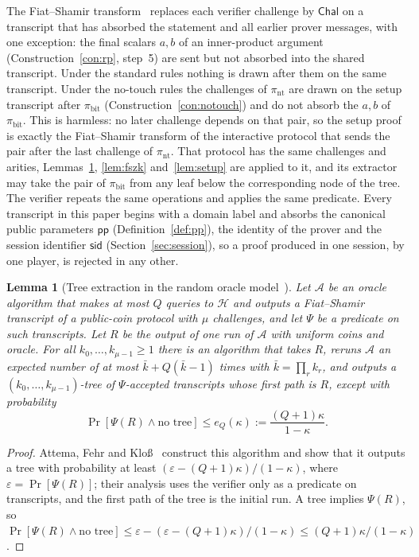 \documentclass[11pt]{article}
\newtheorem{lemma}{Lemma}[section]
\theoremstyle{definition}
\theoremstyle{remark}
\newcommand{\sid}{\mathsf{sid}}
\newcommand{\pp}{\mathsf{pp}}
\newcommand{\RO}{\mathcal{H}}
\begin{document}
The Fiat--Shamir transform~\cite{fiat-shamir} replaces each verifier challenge by $\mathsf{Chal}$ on a transcript that has absorbed the statement and all earlier prover messages, with one exception: the final scalars $a,b$ of an inner-product argument (Construction~\ref{con:rp}, step~5) are sent but not absorbed into the shared transcript. Under the standard rules nothing is drawn after them on the same transcript. Under the no-touch rules the challenges of $\pi_{\mathrm{nt}}$ are drawn on the setup transcript after $\pi_{\mathrm{bit}}$ (Construction~\ref{con:notouch}) and do not absorb the $a,b$ of $\pi_{\mathrm{bit}}$. This is harmless: no later challenge depends on that pair, so the setup proof is exactly the Fiat--Shamir transform of the interactive protocol that sends the pair after the last challenge of $\pi_{\mathrm{nt}}$. That protocol has the same challenges and arities, Lemmas~\ref{lem:tree}, \ref{lem:fszk} and~\ref{lem:setup} are applied to it, and its extractor may take the pair of $\pi_{\mathrm{bit}}$ from any leaf below the corresponding node of the tree. The verifier repeats the same operations and applies the same predicate. Every transcript in this paper begins with a domain label and absorbs the canonical public parameters $\pp$ (Definition~\ref{def:pp}), the identity of the prover and the session identifier $\sid$ (Section~\ref{sec:session}), so a proof produced in one session, by one player, is rejected in any other.

\begin{lemma}[Tree extraction in the random oracle model~\cite{afk}]\label{lem:tree}
Let $\mathcal A$ be an oracle algorithm that makes at most $Q$ queries to $\RO$ and outputs a Fiat--Shamir transcript of a public-coin protocol with $\mu$ challenges, and let $\Psi$ be a predicate on such transcripts. Let $R$ be the output of one run of $\mathcal A$ with uniform coins and oracle. For all $k_0,\ldots,k_{\mu-1}\ge1$ there is an algorithm that takes $R$, reruns $\mathcal A$ an expected number of at most $\bar k+Q(\bar k-1)$ times with $\bar k=\prod_rk_r$, and outputs a $(k_0,\ldots,k_{\mu-1})$-tree of $\Psi$-accepted transcripts whose first path is $R$, except with probability
\[
  \Pr[\Psi(R)\wedge\text{no tree}]\le e_Q(\kappa):=\frac{(Q+1)\kappa}{1-\kappa}.
\]
\end{lemma}
\begin{proof}
Attema, Fehr and Klo\ss~\cite{afk} construct this algorithm and show that it outputs a tree with probability at least $(\varepsilon-(Q+1)\kappa)/(1-\kappa)$, where $\varepsilon=\Pr[\Psi(R)]$; their analysis uses the verifier only as a predicate on transcripts, and the first path of the tree is the initial run. A tree implies $\Psi(R)$, so $\Pr[\Psi(R)\wedge\text{no tree}]\le\varepsilon-(\varepsilon-(Q+1)\kappa)/(1-\kappa)\le(Q+1)\kappa/(1-\kappa)$.
\end{proof}
\end{document}
